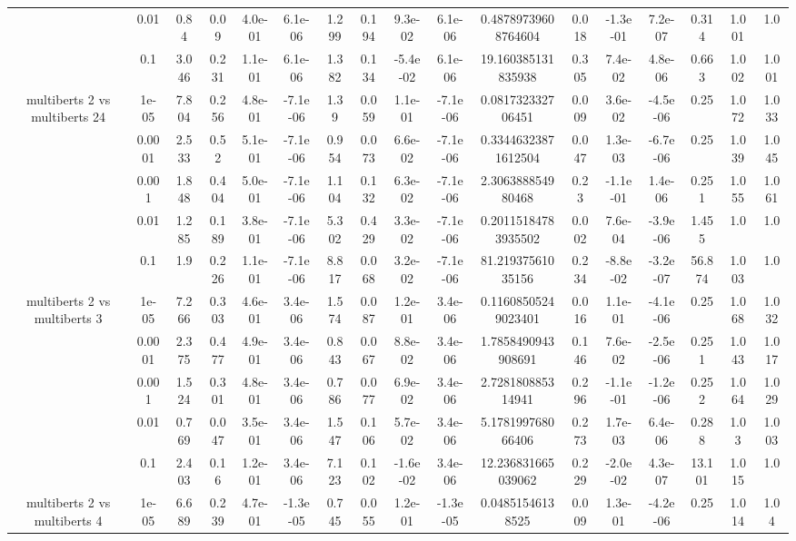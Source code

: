 \begin{tabular}{|c|c|c|c|c|c|c|c|c|c|c|c|c|c|c|c|c|}
 & 0.01 & 0.84 & 0.09 & 4.0e-01 & 6.1e-06 & 1.299 & 0.194 & 9.3e-02 & 6.1e-06 & 0.48789739608764604 & 0.018 & -1.3e-01 & 7.2e-07 & 0.314 & 1.001 & 1.0 \\
 & 0.1 & 3.046 & 0.231 & 1.1e-01 & 6.1e-06 & 1.382 & 0.134 & -5.4e-02 & 6.1e-06 & 19.160385131835938 & 0.305 & 7.4e-02 & 4.8e-06 & 0.663 & 1.002 & 1.001 \\
\hline
\multirow{5}{*}{multiberts 2 vs multiberts 24} & 1e-05 & 7.804 & 0.256 & 4.8e-01 & -7.1e-06 & 1.39 & 0.059 & 1.1e-01 & -7.1e-06 & 0.081732332706451 & 0.009 & 3.6e-02 & -4.5e-06 & 0.25 & 1.072 & 1.033 \\
 & 0.0001 & 2.533 & 0.52 & 5.1e-01 & -7.1e-06 & 0.954 & 0.073 & 6.6e-02 & -7.1e-06 & 0.33446323871612504 & 0.047 & 1.3e-03 & -6.7e-06 & 0.25 & 1.039 & 1.045 \\
 & 0.001 & 1.848 & 0.404 & 5.0e-01 & -7.1e-06 & 1.104 & 0.132 & 6.3e-02 & -7.1e-06 & 2.306388854980468 & 0.23 & -1.1e-01 & 1.4e-06 & 0.251 & 1.055 & 1.061 \\
 & 0.01 & 1.285 & 0.189 & 3.8e-01 & -7.1e-06 & 5.302 & 0.429 & 3.3e-02 & -7.1e-06 & 0.20115184783935502 & 0.002 & 7.6e-04 & -3.9e-06 & 1.455 & 1.0 & 1.0 \\
 & 0.1 & 1.9 & 0.226 & 1.1e-01 & -7.1e-06 & 8.817 & 0.068 & 3.2e-02 & -7.1e-06 & 81.21937561035156 & 0.234 & -8.8e-02 & -3.2e-07 & 56.874 & 1.003 & 1.0 \\
\hline
\multirow{5}{*}{multiberts 2 vs multiberts 3} & 1e-05 & 7.266 & 0.303 & 4.6e-01 & 3.4e-06 & 1.574 & 0.087 & 1.2e-01 & 3.4e-06 & 0.11608505249023401 & 0.016 & 1.1e-01 & -4.1e-06 & 0.25 & 1.068 & 1.032 \\
 & 0.0001 & 2.375 & 0.477 & 4.9e-01 & 3.4e-06 & 0.843 & 0.067 & 8.8e-02 & 3.4e-06 & 1.7858490943908691 & 0.146 & 7.6e-02 & -2.5e-06 & 0.251 & 1.043 & 1.017 \\
 & 0.001 & 1.524 & 0.301 & 4.8e-01 & 3.4e-06 & 0.786 & 0.077 & 6.9e-02 & 3.4e-06 & 2.728180885314941 & 0.296 & -1.1e-01 & -1.2e-06 & 0.252 & 1.064 & 1.029 \\
 & 0.01 & 0.769 & 0.047 & 3.5e-01 & 3.4e-06 & 1.547 & 0.106 & 5.7e-02 & 3.4e-06 & 5.178199768066406 & 0.273 & 1.7e-03 & 6.4e-06 & 0.288 & 1.03 & 1.003 \\
 & 0.1 & 2.403 & 0.16 & 1.2e-01 & 3.4e-06 & 7.123 & 0.102 & -1.6e-02 & 3.4e-06 & 12.236831665039062 & 0.229 & -2.0e-02 & 4.3e-07 & 13.101 & 1.015 & 1.0 \\
\hline
\multirow{5}{*}{multiberts 2 vs multiberts 4} & 1e-05 & 6.689 & 0.239 & 4.7e-01 & -1.3e-05 & 0.745 & 0.055 & 1.2e-01 & -1.3e-05 & 0.04851546138525 & 0.009 & 1.3e-01 & -4.2e-06 & 0.25 & 1.014 & 1.04 \\

\end{tabular}
